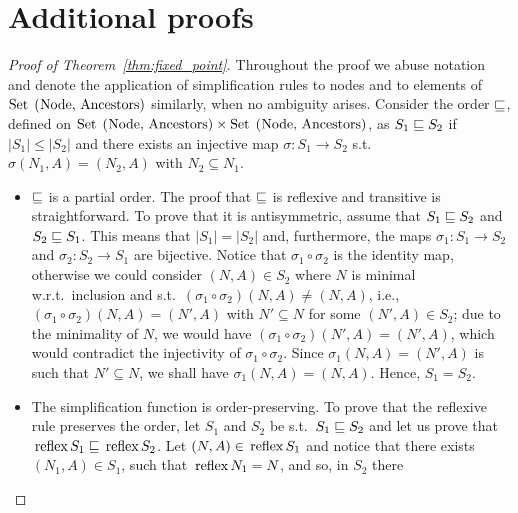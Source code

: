 \section{Additional proofs}
\label{sec:additional-proofs}

\begin{proof}[Proof of Theorem~\ref{thm:fixed_point}]
  Throughout the proof we abuse notation and denote the application
  of simplification rules to nodes and to elements of
  $\text{\lstinline{Set (Node, Ancestors)}}$ similarly, when no
  ambiguity arises.
%
  Consider the order $\sqsubseteq$, defined on
  $\text{\lstinline{Set (Node, Ancestors)}} \times
  \text{\lstinline{Set (Node, Ancestors)}}$, as $S_1 \sqsubseteq S_2$ if
  $|S_1| \leq |S_2|$ and there exists an injective map
  $\sigma : S_1 \rightarrow S_2$ s.t.\ $\sigma(N_1,A) = (N_2,A)$ with
  $N_2\subseteq N_1$.
  \begin{itemize}
  \item $\sqsubseteq$ is a partial order. The proof that $\sqsubseteq$ is
    reflexive and transitive is straightforward.  To prove that it is
    antisymmetric, assume that $S_1\sqsubseteq S_2$ and
    $S_2 \sqsubseteq S_1$.  This means that $|S_1|=|S_2|$ and,
    furthermore, the maps $\sigma_1 : S_1 \rightarrow S_2$ and
    $\sigma_2 : S_2 \rightarrow S_1$ are bijective. Notice that
    $\sigma_1\circ \sigma_2$ is the identity map, otherwise we could
    consider $(N,A)\in S_2$ where $N$ is minimal w.r.t.\ inclusion and
    s.t.\ $(\sigma_1\circ \sigma_2)(N,A) \neq (N,A)$, i.e.,
    $(\sigma_1\circ \sigma_2)(N,A) = (N',A)$ with $N'\subseteq N$ for
    some $(N',A)\in S_2$; due to the minimality of $N$, we would have
    $(\sigma_1\circ \sigma_2)(N',A) = (N',A)$, which would contradict
    the injectivity of $\sigma_1\circ \sigma_2$. Since
    $\sigma_1 (N,A) = (N',A)$ is such that $N'\subseteq N$, we shall
    have $\sigma_1 (N,A) = (N,A)$. Hence, $S_1=S_2$.
  \item The simplification function is order-preserving.
	To prove that the reflexive rule preserves the order, let
        $S_1$ and $S_2$ be s.t.\ $S_1\sqsubseteq S_2$ and let us prove
        that
        $\text{\lstinline{reflex}}
        S_1\leqSets\text{\lstinline{reflex}}S_2$.
	Let $(N,A)\in \text{\lstinline{reflex}} S_1$ and notice that
        there exists $(N_1,A)\in S_1$, such that
        $\text{\lstinline{reflex}} N_1 = N $, and so, in $S_2$ there

\end{itemize}
\end{proof}
